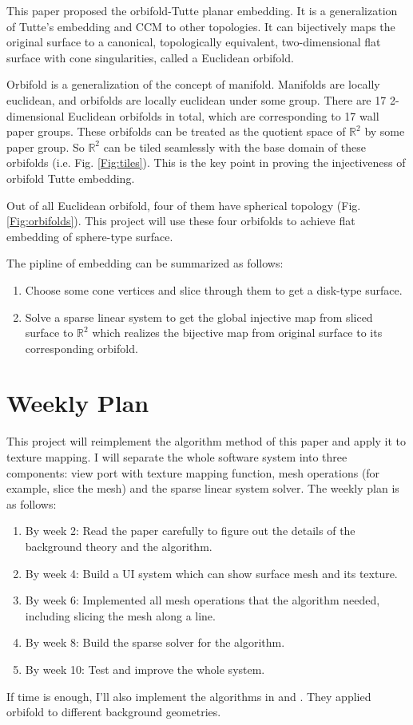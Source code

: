 \documentclass[journal, a4paper]{IEEEtran}
\begin{document}
    This paper proposed the orbifold-Tutte planar embedding. It is a generalization of Tutte’s embedding and CCM to other topologies. It can bijectively maps the original surface to a canonical, topologically equivalent, two-dimensional flat surface with cone singularities, called a Euclidean orbifold.
    
    Orbifold is a generalization of the concept of manifold. Manifolds are locally euclidean, and orbifolds are locally euclidean under some group. There are 17 2-dimensional Euclidean orbifolds in total, which are corresponding to 17 wall paper groups. These orbifolds can be treated as the quotient space of $\mathbb{R}^2$ by some paper group. So $\mathbb{R}^2$ can be tiled seamlessly with the base domain of these orbifolds (i.e. Fig. \ref{Fig:tiles}). This is the key point in proving the injectiveness of orbifold Tutte embedding.
    
    Out of all Euclidean orbifold, four of them have spherical topology (Fig. \ref{Fig:orbifolds}). This project will use these four orbifolds to achieve flat embedding of sphere-type surface.
    
    The pipline of embedding can be summarized as follows:
    \begin{enumerate}
    \item Choose some cone vertices and slice through them to get a disk-type surface.
    \item Solve a sparse linear system to get the global injective map from sliced surface to $\mathbb{R}^2$ which realizes the bijective map from original surface to its corresponding orbifold.
    \end{enumerate}
  	
   
    
\section{Weekly Plan}
	This project will reimplement the algorithm method of this paper and apply it to texture mapping. 
    I will separate the whole software system into three components: view port with texture mapping function, mesh operations (for example, slice the mesh) and the sparse linear system solver. The weekly plan is as follows:
   \begin{enumerate}
   \item By week 2: Read the paper carefully to figure out the details of the background theory and the algorithm.
   \item By week 4: Build a UI system which can show surface mesh and its texture.
   \item By week 6: Implemented all mesh operations that the algorithm needed, including slicing the mesh along a line. 
   \item By week 8: Build the sparse solver for the algorithm.
   \item By week 10: Test and improve the whole system.
   \end{enumerate}
If time is enough, I'll also implement the algorithms in \cite{aigerman2016hyperbolic} and \cite{aigerman2017spherical}. They applied orbifold to different background geometries.
\end{document}
